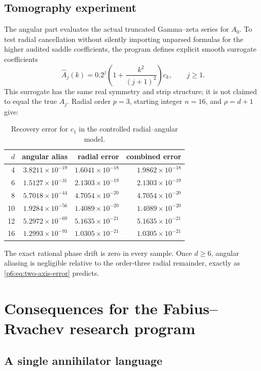 \documentclass[11pt]{article}
\numberwithin{equation}{section}
\theoremstyle{definition}
\theoremstyle{remark}
\begin{document}
\subsection{Tomography experiment}

The angular part evaluates the actual truncated Gamma--zeta series for $A_0$.  To test
radial cancellation without silently importing unparsed formulas for the higher audited
saddle coefficients, the program defines explicit smooth surrogate coefficients
\[
 \widehat A_j(k)=0.2^j\left(1+\frac{k^2}{(j+1)^2}\right)c_k,
 \qquad j\ge1.
\]
This surrogate has the same real symmetry and strip structure; it is not claimed to equal
the true $A_j$.  Radial order $p=3$, starting integer $n=16$, and $\rho=d+1$ give:

\begin{table}[H]
\centering
\caption{Recovery error for $c_1$ in the controlled radial--angular model.}
\label{p6:tab:tomography}
\begin{tabular}{rrrr}
\toprule
$d$ & angular alias & radial error & combined error\\
\midrule
4 & $3.8211\times10^{-19}$ & $1.6041\times10^{-18}$ & $1.9862\times10^{-18}$\\
6 & $1.5127\times10^{-31}$ & $2.1303\times10^{-19}$ & $2.1303\times10^{-19}$\\
8 & $5.7018\times10^{-44}$ & $4.7054\times10^{-20}$ & $4.7054\times10^{-20}$\\
10 & $1.9284\times10^{-56}$ & $1.4089\times10^{-20}$ & $1.4089\times10^{-20}$\\
12 & $5.2972\times10^{-69}$ & $5.1635\times10^{-21}$ & $5.1635\times10^{-21}$\\
16 & $1.2993\times10^{-93}$ & $1.0305\times10^{-21}$ & $1.0305\times10^{-21}$\\
\bottomrule
\end{tabular}
\end{table}

The exact rational phase drift is zero in every sample.  Once $d\ge6$, angular aliasing is
negligible relative to the order-three radial remainder, exactly as
\eqref{p6:eq:two-axis-error} predicts.

\section{Consequences for the Fabius--Rvachev research program}
\label{p6:sec:consequences}

\subsection{A single annihilator language}
\end{document}
